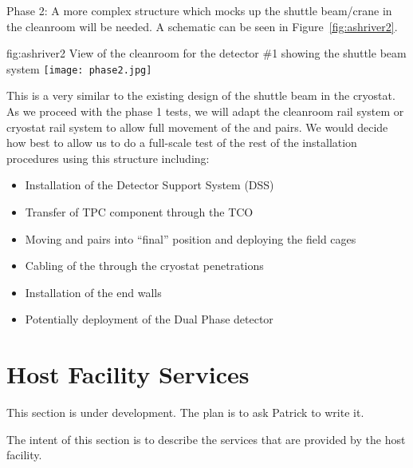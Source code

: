 Phase 2: A more complex structure which mocks up the shuttle
beam/crane in the cleanroom will be needed. A schematic can be seen in
Figure~\ref{fig:ashriver2}.
\begin{dunefigure}{fig:ashriver2}
  {View of the cleanroom for the  detector \#1 showing the
    shuttle beam system}
  \texttt{[image: phase2.jpg]}
\end{dunefigure}
This is a very similar to the existing design of the shuttle beam in
the cryostat.  As we proceed with the phase 1 tests, we will adapt the
cleanroom rail system or cryostat rail system to allow full movement
of the  and  pairs. We would decide how best to
allow us to do a full-scale test of the rest of the installation
procedures using this structure including:
\begin{itemize}
 \item Installation of the Detector Support System (DSS)
 \item Transfer of TPC component through the TCO
 \item Moving  and  pairs into ``final'' position and deploying the field cages
 \item Cabling of the  through the cryostat penetrations
 \item Installation of the end walls
 \item Potentially deployment of the Dual Phase detector
\end{itemize}

\section{ Host Facility Services}
\label{sec:fdsp-coord-host_facility_services}

This section is under development. The plan is to ask Patrick to write
it.

The intent of this section is to describe the services that are
provided by the host facility.

